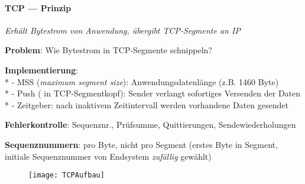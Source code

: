 \paragraph{TCP --- Prinzip}
\begin{items}
  \item \emph{Erhält Bytestrom von Anwendung, übergibt TCP-Segmente an IP}
  \item \textbf{Problem}: Wie Bytestrom in TCP-Segmente schnippeln?
  \item \textbf{Implementierung}: \\*
    - MSS (\emph{maximum segment size}): Anwendungsdatenlänge (z.B. 1460 Byte) \\*
    - Push ( in TCP-Segmentkopf): Sender verlangt sofortiges Versenden der Daten \\*
    - Zeitgeber: nach inaktivem Zeitintervall werden vorhandene Daten gesendet
  \item \textbf{Fehlerkontrolle}: Sequenznr., Prüfsumme, Quittierungen, Sendewiederholungen
  \item \textbf{Sequenznummern}: pro Byte, nicht pro Segment (erstes Byte in Segment, initiale Sequenznummer von Endsystem \emph{zufällig} gewählt)
\end{items}
\begin{figure}[H]\centering\label{TCPAufbau}\texttt{[image: TCPAufbau]}\end{figure}

